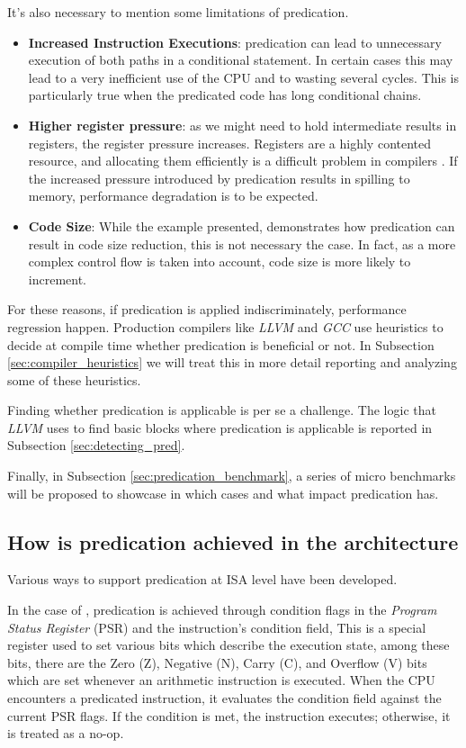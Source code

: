 It's also necessary to mention some limitations of predication.
\begin{itemize}
    \item \textbf{Increased Instruction Executions}: predication can lead to unnecessary execution of both paths in a conditional statement. In certain cases this may lead to a very inefficient use of the CPU and to wasting several cycles. This is particularly true when the predicated code has long conditional chains.
    \item \textbf{Higher register pressure}: as we might need to hold intermediate results in registers, the register pressure increases. Registers are a highly contented resource, and allocating them efficiently is a difficult problem in compilers \cite{chaitin1981register}. If the increased pressure introduced by predication results in spilling to memory, performance degradation is to be expected.
    \item \textbf{Code Size}: While the example presented,  demonstrates how predication can result in code size reduction, this is not necessary the case. In fact, as a more complex control flow is taken into account, code size is more likely to increment.
\end{itemize}

For these reasons, if predication is applied indiscriminately, performance regression happen. Production compilers like \textit{LLVM} and \textit{GCC} use heuristics to decide at compile time whether predication is beneficial or not. In Subsection \ref{sec:compiler_heuristics} we will treat this in more detail reporting and analyzing some of these heuristics.

Finding whether predication is applicable is per se a challenge. The logic that \textit{LLVM} uses to find basic blocks where predication is applicable is reported in Subsection \ref{sec:detecting_pred}.

Finally, in Subsection \ref{sec:predication_benchmark}, a series of micro benchmarks will be proposed to showcase in which cases and what impact predication has.

\subsection{How is predication achieved in the architecture}
\label{sec:arch_support}

Various ways to support predication at ISA level have been developed.

In the case of \armvs, predication is achieved through condition flags in the \textit{Program Status Register} (PSR) and the instruction’s condition field,
This is a special register used to set various bits which describe the execution state, among these bits, there are the Zero (Z), Negative (N), Carry (C), and Overflow (V) bits which are set whenever an arithmetic instruction is executed.
When the CPU encounters a predicated instruction, it evaluates the condition field against the current PSR flags. If the condition is met, the instruction executes; otherwise, it is treated as a no-op.

